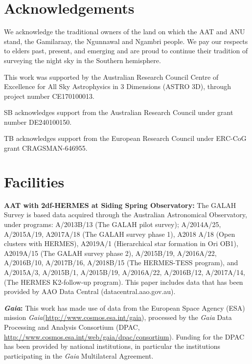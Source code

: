 \documentclass[fleqn,usenatbib]{mnras}
\newcommand{\Gaia}{\textit{Gaia}\xspace} %
\begin{document}

\section*{Acknowledgements}

We acknowledge the traditional owners of the land on which the AAT and ANU stand, the Gamilaraay, the Ngunnawal and Ngambri people. We pay our respects to elders past, present, and emerging and are proud to continue their tradition of surveying the night sky in the Southern hemisphere.

This work was supported by the Australian Research Council Centre of Excellence for All Sky Astrophysics in 3 Dimensions (ASTRO 3D), through project number CE170100013.

SB acknowledges support from the Australian Research Council under grant number DE240100150.

TB acknowledges support from the European Research Council under ERC-CoG grant CRAGSMAN-646955.

\section*{Facilities}

\textbf{AAT with 2df-HERMES at Siding Spring Observatory:}
The GALAH Survey is based data acquired through the Australian Astronomical Observatory, under programs: A/2013B/13 (The GALAH pilot survey); A/2014A/25, A/2015A/19, A2017A/18 (The GALAH survey phase 1), A2018 A/18 (Open clusters with HERMES), A2019A/1 (Hierarchical star formation in Ori OB1), A2019A/15 (The GALAH survey phase 2), A/2015B/19, A/2016A/22, A/2016B/10, A/2017B/16, A/2018B/15 (The HERMES-TESS program), and A/2015A/3, A/2015B/1, A/2015B/19, A/2016A/22, A/2016B/12, A/2017A/14, (The HERMES K2-follow-up program). This paper includes data that has been provided by AAO Data Central (datacentral.aao.gov.au).

\textbf{\Gaia: } This work has made use of data from the European Space Agency (ESA) mission \Gaia (\url{http://www.cosmos.esa.int/gaia}), processed by the \Gaia Data Processing and Analysis Consortium (DPAC, \url{http://www.cosmos.esa.int/web/gaia/dpac/consortium}). Funding for the DPAC has been provided by national institutions, in particular the institutions participating in the \Gaia Multilateral Agreement. 
\end{document}

